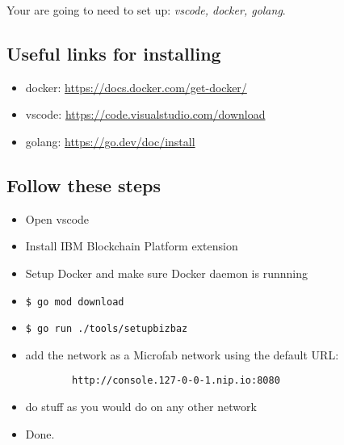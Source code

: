 Your are going to need to set up: \emph{vscode, docker, golang}.
\subsection{Useful links for installing}
\begin{itemize}
    \item docker: \href{https://docs.docker.com/get-docker/}{https://docs.docker.com/get-docker/}
    \item vscode: \href{https://code.visualstudio.com/download}{https://code.visualstudio.com/download}
    \item golang: \href{https://go.dev/doc/install}{https://go.dev/doc/install}
\end{itemize}
\subsection{Follow these steps}
\begin{itemize}
    \item Open vscode
    \item Install IBM Blockchain Platform extension
    \item Setup Docker and make sure Docker daemon is runnning
    \item \begin{verbatim}$ go mod download\end{verbatim}
    \item \begin{verbatim}$ go run ./tools/setupbizbaz\end{verbatim}
    \item add the network as a Microfab network using the default URL: \begin{verbatim}
        http://console.127-0-0-1.nip.io:8080
    \end{verbatim}
    \item do stuff as you would do on any other network
    \item Done.
\end{itemize}